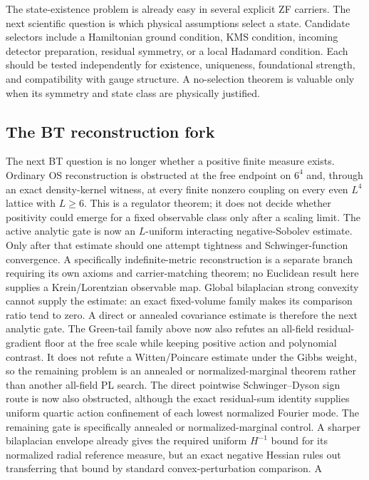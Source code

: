 \documentclass[11pt]{article}
\theoremstyle{definition}
\theoremstyle{remark}
\begin{document}
The state-existence problem is already easy in several explicit ZF carriers.
The next scientific question is which physical assumptions select a state.
Candidate selectors include a Hamiltonian ground condition, KMS condition,
incoming detector preparation, residual symmetry, or a local Hadamard
condition.  Each should be tested independently for existence, uniqueness,
foundational strength, and compatibility with gauge structure.  A no-selection
theorem is valuable only when its symmetry and state class are physically
justified.

\subsection{The BT reconstruction fork}

The next BT question is no longer whether a positive finite measure exists.
Ordinary OS reconstruction is obstructed at the free endpoint on \(6^4\)
and, through an exact density-kernel witness, at every finite nonzero coupling
on every even \(L^4\) lattice with \(L\geq6\).  This is a regulator theorem;
it does not decide whether positivity could emerge for a fixed observable
class only after a scaling limit.  The active analytic gate is now an
\(L\)-uniform interacting negative-Sobolev estimate.  Only after that estimate
should one attempt tightness and Schwinger-function convergence.  A specifically
indefinite-metric reconstruction is a separate branch requiring its own
axioms and carrier-matching theorem; no Euclidean result here supplies a
Krein/Lorentzian observable map.  Global bilaplacian strong convexity cannot
supply the estimate: an exact fixed-volume family makes its comparison ratio
tend to zero.  A direct or annealed covariance estimate is therefore the next
analytic gate.  The Green-tail family above now also refutes an all-field
residual-gradient floor at the free scale while keeping positive action and
polynomial contrast.  It does not refute a Witten/Poincare estimate under the
Gibbs weight, so the remaining problem is an annealed or normalized-marginal
theorem rather than another all-field PL search.  The direct pointwise
Schwinger--Dyson sign route is now also
obstructed, although the exact residual-sum identity supplies uniform quartic
action confinement of each lowest normalized Fourier mode.  The remaining
gate is specifically annealed or normalized-marginal control.  A sharper
bilaplacian envelope already gives the required uniform \(H^{-1}\) bound for
its normalized radial reference measure, but an exact negative Hessian rules
out transferring that bound by standard convex-perturbation comparison.  A
\end{document}
